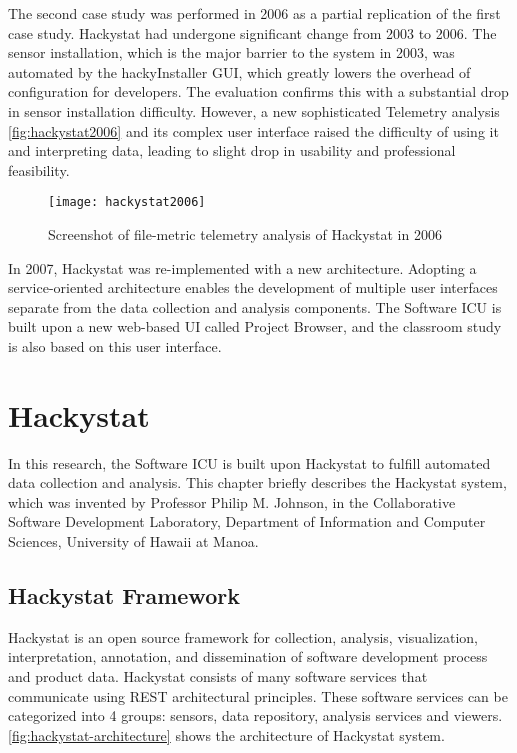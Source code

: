 The second case study was performed in 2006 as a partial replication of the first case study\cite{csdl2-07-02}. Hackystat had undergone significant change from 2003 to 2006. The sensor installation, which is the major barrier to the system in 2003, was automated by the hackyInstaller GUI, which greatly lowers the overhead of configuration for developers. The evaluation confirms this with a substantial drop in sensor installation difficulty. However, a new sophisticated Telemetry analysis \autoref{fig:hackystat2006} and its complex user interface raised the difficulty of using it and interpreting data, leading to slight drop in usability and professional feasibility.

\begin{figure}[htbp]
   \centering
   \texttt{[image: hackystat2006]} 
   \caption{Screenshot of file-metric telemetry analysis of Hackystat in 2006}
   \label{fig:hackystat2006}
\end{figure}

In 2007, Hackystat was re-implemented with a new architecture. Adopting a service-oriented architecture enables the development of multiple user interfaces separate from the data collection and analysis components. The Software ICU is built upon a new web-based UI called Project Browser, and the classroom study is also based on this user interface.


\chapter{Hackystat}
In this research, the Software ICU is built upon Hackystat to fulfill automated data collection and analysis. This chapter briefly describes the Hackystat system, which was invented by Professor Philip M. Johnson, in the Collaborative Software Development Laboratory, Department of Information and Computer Sciences, University of Hawaii at Manoa. 
 
\section{Hackystat Framework}
Hackystat is an open source framework for collection, analysis, visualization, interpretation, annotation, and dissemination of software development process and product data. Hackystat consists of many software services that communicate using REST architectural principles\cite{rest}. These software services can be categorized into 4 groups: sensors, data repository, analysis services and viewers. \autoref{fig:hackystat-architecture} shows the architecture of Hackystat system. 


